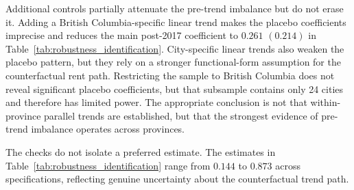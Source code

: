 \documentclass[12pt]{article}
\begin{document}
Additional controls partially attenuate the pre-trend imbalance but do not erase it.
Adding a British Columbia-specific linear trend makes the placebo coefficients
imprecise and reduces the main post-2017 coefficient to
$0.261$ $(0.214)$ in Table~\ref{tab:robustness_identification}. City-specific
linear trends also weaken the placebo pattern, but they rely on a stronger
functional-form assumption for the counterfactual rent path. Restricting the
sample to British Columbia does not reveal significant placebo coefficients, but
that subsample contains only 24 cities and therefore has limited power. The
appropriate conclusion is not that within-province parallel trends are established,
but that the strongest evidence of pre-trend imbalance operates across provinces.

The checks do not isolate a preferred estimate. The estimates in Table~\ref{tab:robustness_identification}
range from $0.144$ to $0.873$ across specifications, reflecting genuine uncertainty
about the counterfactual trend path.
\end{document}
